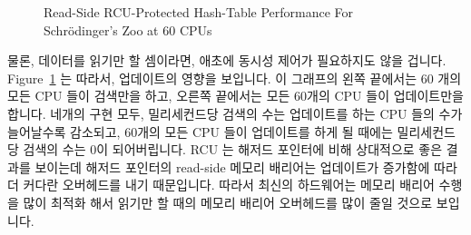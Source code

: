 \begin{figure}[tb]
\centering
{}
\caption{Read-Side RCU-Protected Hash-Table Performance For Schr\"odinger's Zoo at 60 CPUs}
\label{fig:datastruct:Read-Side RCU-Protected Hash-Table Performance For Schroedinger's Zoo at 60 CPUs}
\end{figure}

물론, 데이터를 읽기만 할 셈이라면, 애초에 동시성 제어가 필요하지도 않을 겁니다.
Figure~\ref{fig:datastruct:Read-Side RCU-Protected Hash-Table Performance For Schroedinger's Zoo at 60 CPUs}
는 따라서, 업데이트의 영향을 보입니다.
이 그래프의 왼쪽 끝에서는 60 개의 모든 CPU 들이 검색만을 하고, 오른쪽 끝에서는
모든 60개의 CPU 들이 업데이트만을 합니다.
네개의 구현 모두, 밀리세컨드당 검색의 수는 업데이트를 하는 CPU 들의 수가
늘어날수록 감소되고, 60개의 모든 CPU 들이 업데이트를 하게 될 때에는
밀리세컨드당 검색의 수는 0이 되어버립니다.
RCU 는 해저드 포인터에 비해 상대적으로 좋은 결과를 보이는데 해저드 포인터의
read-side 메모리 배리어는 업데이트가 증가함에 따라 더 커다란 오버헤드를 내기
때문입니다.
따라서 최신의 하드웨어는 메모리 배리어 수행을 많이 최적화 해서 읽기만 할 때의
메모리 배리어 오버헤드를 많이 줄일 것으로 보입니다.

